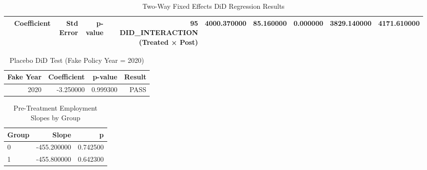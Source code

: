 \begin{table}[H]
\caption{Two-Way Fixed Effects DiD Regression Results}
\label{tab:did}
\begin{tabular}{lrrrrr}
\toprule
 & Coefficient & Std Error & p-value & 95%
\midrule
DID\_INTERACTION (Treated × Post) & 4000.370000 & 85.160000 & 0.000000 & 3829.140000 & 4171.610000 \\
\bottomrule
\end{tabular}
\end{table}


\begin{table}[H]
\caption{Placebo DiD Test (Fake Policy Year = 2020)}
\label{tab:placebo}
\begin{tabular}{rrrr}
\toprule
Fake Year & Coefficient & p-value & Result \\
\midrule
2020 & -3.250000 & 0.999300 & PASS \\
\bottomrule
\end{tabular}
\end{table}


\begin{table}[H]
\caption{Pre-Treatment Employment Slopes by Group}
\label{tab:pt}
\begin{tabular}{lrr}
\toprule
Group & Slope & p \\
\midrule
0 & -455.200000 & 0.742500 \\
1 & -455.800000 & 0.642300 \\
\bottomrule
\end{tabular}
\end{table}
